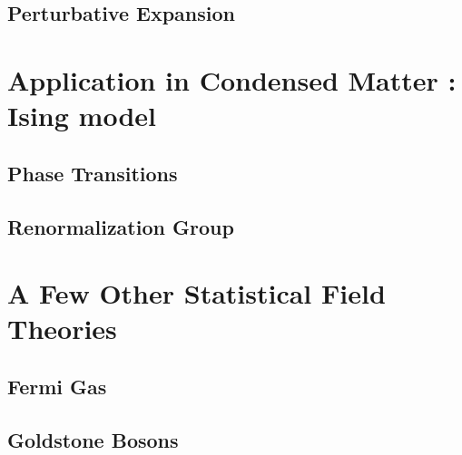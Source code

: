 \documentclass[12pt]{report}
\begin{document}
\chapter{Perturbative Expansion}


\part{Application in Condensed Matter : Ising model}

\chapter{Phase Transitions}


\chapter{Renormalization Group}


\part{A Few Other Statistical Field Theories}

\chapter{Fermi Gas}


\chapter{Goldstone Bosons}

\end{document}

